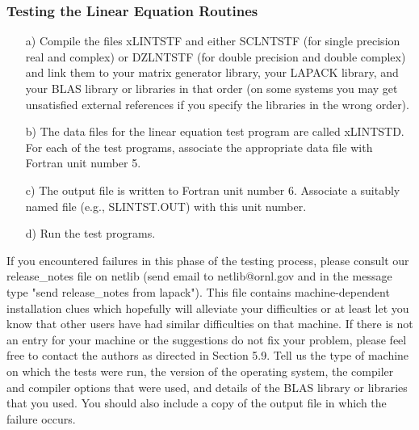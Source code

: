\subsubsection{Testing the Linear Equation Routines}

\begin{itemize}

\item[a)]
Compile the files xLINTSTF and either SCLNTSTF (for single precision
real and complex) or DZLNTSTF (for double precision and double complex)
and link them to your matrix generator 
library, your LAPACK library, and your BLAS library or libraries
in that order (on some systems you may get
unsatisfied external references if you specify the libraries
in the wrong order).

\item[b)]
The data files for the linear equation test program are called xLINTSTD.
For each of the test programs, associate the appropriate data file
with Fortran unit number 5.

\item[c)]
The output file is written to Fortran unit number 6.  Associate a
suitably named file (e.g., SLINTST.OUT) with this unit number.

\item[d)]
Run the test programs.

\end{itemize}

If you encountered failures in this phase of the testing process, please
consult our release\_notes file on netlib (send email to netlib@ornl.gov
and in the message type "send release\_notes from lapack").  This file
contains machine-dependent installation clues which hopefully will
alleviate your difficulties or at least let you know that other users
have had similar difficulties on that machine.  If there is not an entry
for your machine or the suggestions do not fix your problem, please feel
free to contact the authors as directed in Section 5.9.  Tell us the
type of machine on which the tests were run, the version of the operating
system, the compiler and compiler options that were used,
and details of the BLAS library or libraries that you used.  You should
also include a copy of the output file in which the failure occurs.

